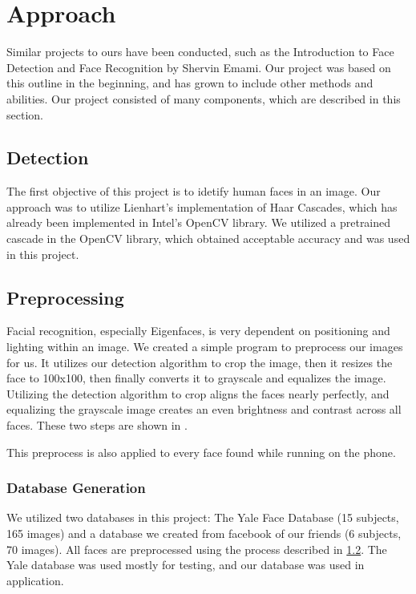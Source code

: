 \section{Approach} %

Similar projects to ours have been conducted, such as the Introduction
to Face Detection and Face Recognition by Shervin Emami\cite{Emami}.
Our project was based on this outline in the beginning, and has grown
to include other methods and abilities.  Our project consisted of many
components, which are described in this section.

\subsection{Detection}

The first objective of this project is to idetify human faces in an
image.  Our approach was to utilize Lienhart's implementation
\cite{Lienhart} of Haar Cascades, which has already been implemented
in Intel's OpenCV library. \cite{opencv} We utilized a pretrained
cascade in the OpenCV library, which obtained acceptable accuracy and
was used in this project.

\subsection{Preprocessing}\label{preprocess}

Facial recognition, especially Eigenfaces, is very dependent on
positioning and lighting within an image.  We created a simple program
to preprocess our images for us.  It utilizes our detection algorithm
to crop the image, then it resizes the face to 100x100, then finally
converts it to grayscale and equalizes the image.  Utilizing the
detection algorithm to crop aligns the faces nearly perfectly, and
equalizing the grayscale image creates an even brightness and contrast
across all faces. These two steps are shown in
.


This preprocess is also applied to every face found while running on
the phone.

\subsubsection{Database Generation}

We utilized two databases in this project: The Yale Face Database
\cite{YaleFace} (15 subjects, 165 images) and a database we created
from facebook of our friends (6 subjects, 70 images).  All faces are
preprocessed using the process described in \ref{preprocess}.  The
Yale database was used mostly for testing, and our database was used
in application.

